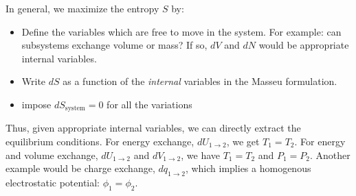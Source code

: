 \documentclass[12pt]{article}
\begin{document}
In general, we maximize the entropy $S$ by:
\begin{itemize}
\item Define the variables which are free to move in the system. For example: can subsystems exchange volume or mass? If so, $dV$ and $dN$ would be appropriate internal variables.
\item Write $dS$ as a function of the \emph{internal} variables in the Masseu formulation.
\item impose $dS_\text{system} = 0$ for all the variations
\end{itemize}
Thus, given appropriate internal variables, we can directly extract the equilibrium conditions.  For energy exchange, $dU_{1\rightarrow 2}$, we get $T_1 = T_2$.  For energy and volume exchange, $dU_{1\rightarrow 2}$ and $dV_{1\rightarrow 2}$, we have $T_1 = T_2$ and $P_1 = P_2$.  Another example would be charge exchange, $dq_{1\rightarrow 2}$, which implies a homogenous electrostatic potential: $\phi_1 = \phi_2$.



\end{document}
